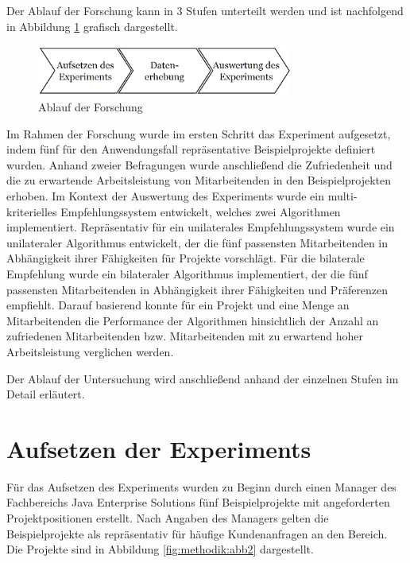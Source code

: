 Der Ablauf der Forschung kann in 3 Stufen unterteilt werden und ist nachfolgend in Abbildung \ref{fig:methodik:abb1} grafisch dargestellt.

\begin{figure}[H]
    \centering
	\includegraphics[width=0.75\textwidth]{gfx/prozess-forschung.png}
	\caption[Ablauf der Forschung]{Ablauf der Forschung}
	\label{fig:methodik:abb1}
\end{figure}

Im Rahmen der Forschung wurde im ersten Schritt das Experiment aufgesetzt, indem fünf für den Anwendungsfall repräsentative Beispielprojekte definiert wurden.
Anhand zweier Befragungen wurde anschließend die Zufriedenheit und die zu erwartende Arbeitsleistung von Mitarbeitenden in den Beispielprojekten erhoben.
Im Kontext der Auswertung des Experiments wurde ein multi-kriterielles Empfehlungssystem entwickelt, welches zwei Algorithmen implementiert.
Repräsentativ für ein unilaterales Empfehlungssystem wurde ein unilateraler Algorithmus entwickelt, der die fünf passensten Mitarbeitenden in Abhängigkeit ihrer Fähigkeiten für Projekte vorschlägt.
Für die bilaterale Empfehlung wurde ein bilateraler Algorithmus implementiert, der die fünf passensten Mitarbeitenden in Abhängigkeit ihrer Fähigkeiten und Präferenzen empfiehlt.
Darauf basierend konnte für ein Projekt und eine Menge an Mitarbeitenden die Performance der Algorithmen hinsichtlich der Anzahl an zufriedenen Mitarbeitenden bzw. Mitarbeitenden mit zu erwartend hoher Arbeitsleistung verglichen werden.

Der Ablauf der Untersuchung wird anschließend anhand der einzelnen Stufen im Detail erläutert.

\section{Aufsetzen der Experiments}
Für das Aufsetzen des Experiments wurden zu Beginn durch einen Manager des Fachbereichs Java Enterprise Solutions fünf Beispielprojekte mit angeforderten Projektpositionen erstellt.
Nach Angaben des Managers gelten die Beispielprojekte als repräsentativ für häufige Kundenanfragen an den Bereich.
Die Projekte sind in Abbildung \ref{fig:methodik:abb2} dargestellt.

